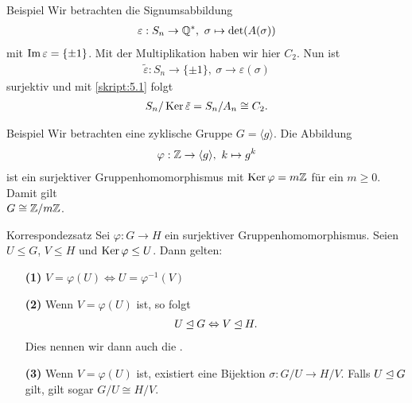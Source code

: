 \begin{genericdf}{Beispiel}\label{skript:5.2}
	Wir betrachten die Signumsabbildung
	\begin{align*}
	\varepsilon : S_n \to \mathbb{Q}^\ast , \ \sigma \mapsto \det(A(\sigma))
	\end{align*}
	mit $ \operatorname{Im} \varepsilon  = \lbrace \pm 1 \rbrace$. Mit der Multiplikation haben wir hier $ C_2 $.
	Nun ist
	\begin{align*}
	\tilde{\varepsilon} : S_n \to \lbrace \pm 1 \rbrace , \ \sigma \to \varepsilon(\sigma)
	\end{align*}
	surjektiv und mit \ref{skript:5.1} folgt
	\begin{align*}
	S_n / \operatorname{Ker} \tilde{\varepsilon} = S_n / A_n \cong C_2.
	\end{align*}
\end{genericdf}

\begin{genericdf}{Beispiel}\label{skript:5.3}
	Wir betrachten eine zyklische Gruppe $ G = \langle g \rangle $. Die Abbildung
	\begin{align*}
	\varphi : \mathbb{Z} \to \langle g \rangle, \ k \mapsto g^k
	\end{align*}
	ist ein surjektiver Gruppenhomomorphismus mit $ \operatorname{Ker} \varphi = m\mathbb{Z}  $ für ein $ m \geq 0 $.
	Damit gilt \\
	$ G \cong \mathbb{Z} / m \mathbb{Z} $.
\end{genericdf}

\begin{genericthm}{Korrespondezsatz} \label{skript:5.4}  
	Sei $ \varphi : G \to H $ ein surjektiver Gruppenhomomorphismus.
	Seien $ U \leq G $, $ V \leq H $ und $ \operatorname{Ker} \varphi \leq U $.
	Dann gelten:
	\begin{enumerate}
		\item[\textbf{(1)}]
		$ V = \varphi(U) \Leftrightarrow U = \varphi^{-1}(V) $
		\item[\textbf{(2)}] 
		Wenn $ V = \varphi(U) $ ist, so folgt
		\begin{align*}
		U \unlhd G \Leftrightarrow V \unlhd H.
		\end{align*}
		Dies nennen wir dann auch die .
		\item[\textbf{(3)}] 
		Wenn $ V = \varphi(U) $ ist, existiert eine Bijektion $ \sigma: G/U  \to H/V$.
		Falls $ U \unlhd G $ gilt, gilt sogar $ G/U \cong H/V $.
	\end{enumerate}
\end{genericthm}

